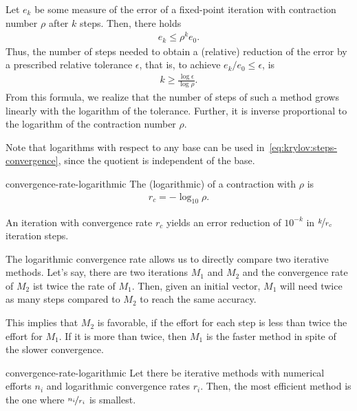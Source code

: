 \begin{remark}
  Let $e_k$ be some measure of the error of a fixed-point iteration
  with contraction number $\rho$ after $k$ steps. Then, there holds
  \begin{gather}
    e_k \le \rho^k e_0.
  \end{gather}
  Thus, the number of steps needed to obtain a (relative) reduction of
  the error by a prescribed relative tolerance $\epsilon$, that is, to
  achieve $e_k/e_0\le\epsilon$, is
  \begin{gather}
    \label{eq:krylov:steps-convergence}
    k \ge \frac{\log\epsilon}{\log\rho}.
  \end{gather}
  From this formula, we realize that the number of steps of such a
  method grows linearly with the logarithm of the tolerance. Further,
  it is inverse proportional to the logarithm of the contraction
  number $\rho$.

  Note that logarithms with respect to any base can be used
  in~\eqref{eq:krylov:steps-convergence}, since the quotient is
  independent of the base.
\end{remark}

\begin{Definition}{convergence-rate-logarithmic}
  The (logarithmic)  of a contraction with
   $\rho$ is
  \begin{gather}
    r_c = -\log_{10} \rho.
  \end{gather}
  
  An iteration with convergence rate $r_c$ yields an error reduction
  of $10^{-k}$ in $\nicefrac{k}{r_c}$ iteration steps.
\end{Definition}

\begin{remark}
  The logarithmic convergence rate allows us to directly compare two
  iterative methods. Let's say, there are two iterations $M_1$ and
  $M_2$ and the convergence rate of $M_2$ ist twice the rate of
  $M_1$. Then, given an initial vector, $M_1$ will need twice as many
  steps compared to $M_2$ to reach the same accuracy.

  This implies that $M_2$ is favorable, if the effort for each step is
  less than twice the effort for $M_1$. If it is more than twice, then
  $M_1$ is the faster method in spite of the slower convergence.
\end{remark}

\begin{Corollary}{convergence-rate-logarithmic}
  Let there be iterative methods with numerical efforts $n_i$ and
  logarithmic convergence rates $r_i$. Then, the most efficient method
  is the one where $\nicefrac{n_i}{r_i}$ is smallest.
\end{Corollary}

